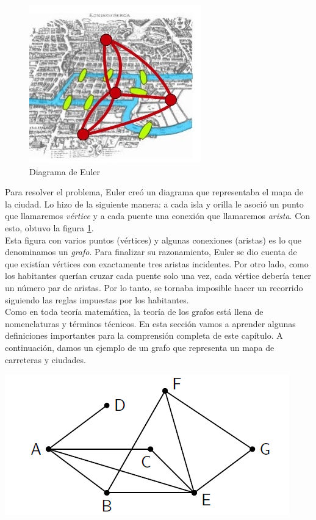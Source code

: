 \documentclass[11pt]{scrartcl}
\begin{document}
\begin{figure}[h!]
    \centering
    \includegraphics[scale=1]{images/clase_10_Konigs_Grafo.png}
    \caption{Diagrama de Euler}
    \label{fig:2}
\end{figure}

Para resolver el problema, Euler creó un diagrama que representaba el mapa de la ciudad. Lo hizo de la siguiente manera: a cada isla y orilla le asoció un punto que llamaremos \textit{ vértice} y a cada puente una conexión que llamaremos \textit{ arista}. Con esto, obtuvo la figura \ref{fig:2}.\\

Esta figura con varios puntos (vértices) y algunas conexiones (aristas) es lo que denominamos un \textit{ grafo}. Para finalizar su razonamiento, Euler se dio cuenta de que existían vértices con exactamente tres aristas incidentes. Por otro lado, como los habitantes querían cruzar cada puente solo una vez, cada vértice debería tener un número par de aristas. Por lo tanto, se tornaba imposible hacer un recorrido siguiendo las reglas impuestas por los habitantes.\\

Como en toda teoría matemática, la teoría de los grafos está llena de nomenclaturas y términos técnicos. En esta sección vamos a aprender algunas definiciones importantes para la comprensión completa de este capítulo. A continuación, damos un ejemplo de un grafo que representa un mapa de carreteras y ciudades.

\begin{center}
    \includegraphics[scale=0.75]{images/clase_10_grafo_1.png}
\end{center}
\end{document}
